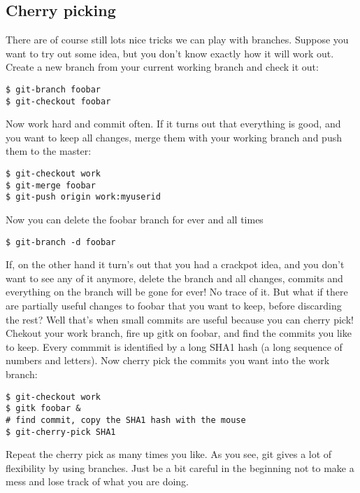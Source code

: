 \documentclass[a4paper,10pt]{article}
\begin{document}
\subsection{Cherry picking}
There are of course still lots nice tricks we can play with
branches. Suppose you want to try out some idea, but you don't know exactly
how it will work out. Create a new branch from your current working branch and
check it out:
\begin{verbatim}
$ git-branch foobar
$ git-checkout foobar
\end{verbatim}
Now work hard and commit often. If it turns out that everything is good, and
you want to keep all changes, merge them with your working branch and push
them to the master:
\begin{verbatim}
$ git-checkout work
$ git-merge foobar
$ git-push origin work:myuserid
\end{verbatim}
Now you can delete the foobar branch for ever and all times
\begin{verbatim}
$ git-branch -d foobar
\end{verbatim}
If, on the other hand it turn's out that you had a crackpot idea, and you
don't want to see any of it anymore, delete the branch and all changes,
commits and everything on the branch will be gone for ever! No trace of it.
But what if there are partially useful changes to foobar that you want to
keep, before discarding the rest? Well that's when small commits are useful
because you can cherry pick! Chekout your work branch, fire up gitk on foobar,
and find the commits you like to keep. Every commmit is identified by a long
SHA1 hash (a long sequence of numbers and letters). Now cherry pick the
commits you want into the work branch:
\begin{verbatim}
$ git-checkout work
$ gitk foobar &
# find commit, copy the SHA1 hash with the mouse
$ git-cherry-pick SHA1
\end{verbatim}
Repeat the cherry pick as many times you like. As you see, git gives a lot of
flexibility by using branches. Just be a bit careful in the beginning not to
make a mess and lose track of what you are doing. 
\end{document}
